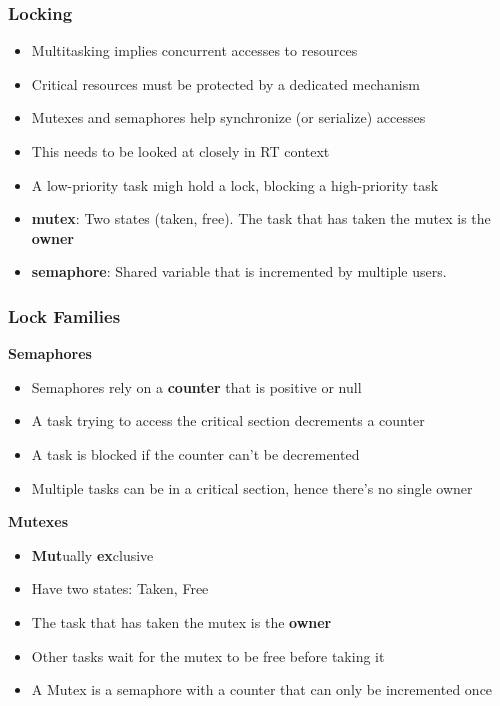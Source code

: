 \begin{frame}
  \frametitle{Locking}
	\begin{itemize}
		\item Multitasking implies concurrent accesses to resources
		\item Critical resources must be protected by a dedicated mechanism
		\item Mutexes and semaphores help synchronize (or serialize) accesses
		\item This needs to be looked at closely in RT context
		\item A low-priority task migh hold a lock, blocking a high-priority task
	\end{itemize}
	\begin{itemize}
		\item \textbf{mutex}: Two states (taken, free). The task that has taken the mutex is the \textbf{owner}
		\item \textbf{semaphore}: Shared variable that is incremented by multiple users.
	\end{itemize}
\end{frame}

\begin{frame}
	\frametitle{Lock Families}
		\begin{center}\textbf{Semaphores}\end{center}
		\begin{itemize}
			\item Semaphores rely on a \textbf{counter} that is positive or null
			\item A task trying to access the critical section decrements a counter
			\item A task is blocked if the counter can't be decremented
			\item Multiple tasks can be in a critical section, hence there's no single owner
		\end{itemize}
		\begin{center}\textbf{Mutexes}\end{center}
		\begin{itemize}
			\item \textbf{Mut}ually \textbf{ex}clusive
			\item Have two states: Taken, Free
			\item The task that has taken the mutex is the \textbf{owner}
			\item Other tasks wait for the mutex to be free before taking it
			\item A Mutex is a semaphore with a counter that can only be incremented once
		\end{itemize}


\end{frame}

